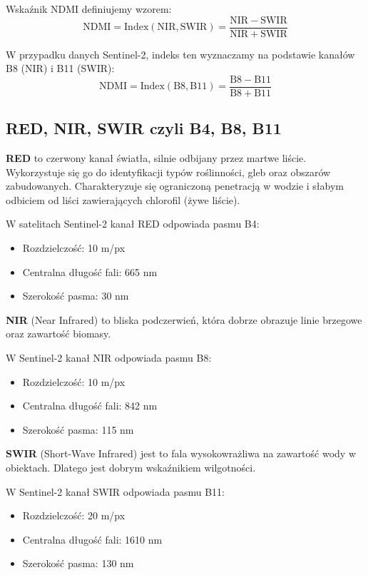 \documentclass[12pt,a4paper]{article}
\begin{document}
Wskaźnik NDMI definiujemy wzorem:
\[
\mathrm{NDMI} = \mathrm{Index}(\mathrm{NIR}, \mathrm{SWIR}) = \frac{\mathrm{NIR} - \mathrm{SWIR}}{\mathrm{NIR} + \mathrm{SWIR}}
\]

W przypadku danych Sentinel-2, indeks ten wyznaczamy na podstawie kanałów B8 (NIR) i B11 (SWIR):
\[
\mathrm{NDMI} = \mathrm{Index}(\mathrm{B8}, \mathrm{B11}) = \frac{\mathrm{B8} - \mathrm{B11}}{\mathrm{B8} + \mathrm{B11}}
\]

\subsection{RED, NIR, SWIR czyli B4, B8, B11}

\textbf{RED} to czerwony kanał światła, silnie odbijany przez martwe liście. Wykorzystuje się go do identyfikacji typów roślinności, gleb oraz obszarów zabudowanych. Charakteryzuje się ograniczoną penetracją w wodzie i słabym odbiciem od liści zawierających chlorofil (żywe liście).

W satelitach Sentinel-2 kanał RED odpowiada pasmu B4: \cite{sentinel2_band_B4}
\begin{itemize}
    \item Rozdzielczość: 10 m/px
    \item Centralna długość fali: 665 nm
    \item Szerokość pasma: 30 nm
\end{itemize}

\textbf{NIR} (Near Infrared) to bliska podczerwień, która dobrze obrazuje linie brzegowe oraz zawartość biomasy.

W Sentinel-2 kanał NIR odpowiada pasmu B8: \cite{sentinel2_band_B8}
\begin{itemize}
    \item Rozdzielczość: 10 m/px
    \item Centralna długość fali: 842 nm
    \item Szerokość pasma: 115 nm
\end{itemize}

\textbf{SWIR} (Short-Wave Infrared) jest to fala wysokowrażliwa na zawartość wody w obiektach. Dlatego jest dobrym wskaźnikiem wilgotności.

W Sentinel-2 kanał SWIR odpowiada pasmu B11: \cite{sentinel2_band_B11}
\begin{itemize}
    \item Rozdzielczość: 20 m/px
    \item Centralna długość fali: 1610 nm
    \item Szerokość pasma: 130 nm
\end{itemize}
\end{document}
